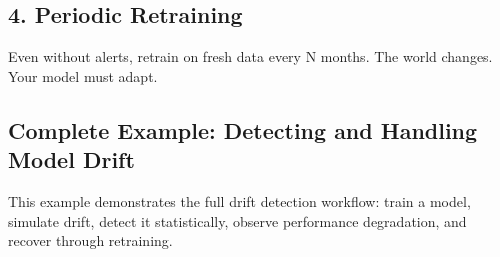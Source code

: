 \subsection{4. Periodic Retraining}

Even without alerts, retrain on fresh data every N months. The world changes. Your model must adapt.

\subsection{Complete Example: Detecting and Handling Model Drift}

This example demonstrates the full drift detection workflow: train a model, simulate drift, detect it statistically, observe performance degradation, and recover through retraining.

